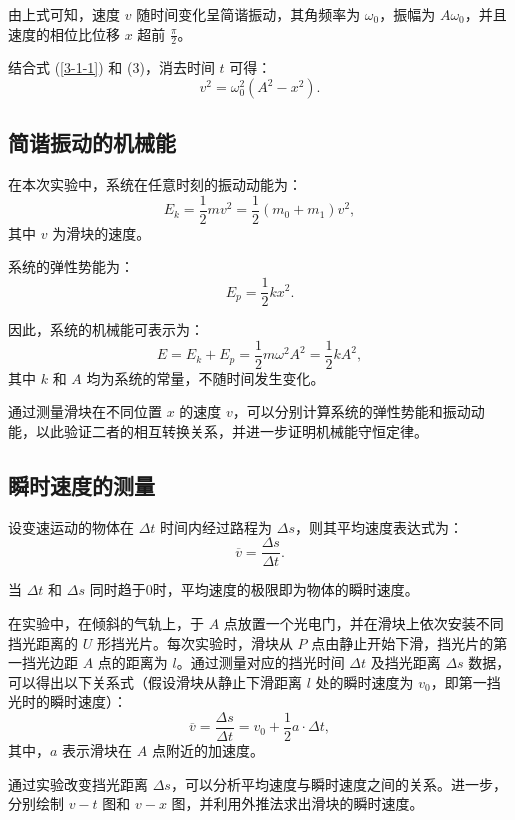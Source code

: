 \documentclass[UTF-8,twoside,cs4size]{ctexart}
\begin{document}
由上式可知，速度 $v$ 随时间变化呈简谐振动，其角频率为 $\omega_0$，振幅为 $A\omega_0$，并且速度的相位比位移 $x$ 超前 $\frac{\pi}{2}$。

结合式 (\ref{3-1-1}) 和 (3)，消去时间 $t$ 可得：
\[
v^2 = \omega_0^2 (A^2 - x^2).
\]

\subsection{简谐振动的机械能}
在本次实验中，系统在任意时刻的振动动能为：
\[
E_k = \frac{1}{2}m v^2 = \frac{1}{2}(m_0 + m_1)v^2,
\]
其中 $v$ 为滑块的速度。

系统的弹性势能为：
\[
E_p = \frac{1}{2}k x^2.
\]

因此，系统的机械能可表示为：
\begin{equation}\label{3-3-3}
    E = E_k + E_p = \frac{1}{2}m\omega^2 A^2 = \frac{1}{2}k A^2,
\end{equation}
其中 $k$ 和 $A$ 均为系统的常量，不随时间发生变化。

通过测量滑块在不同位置 $x$ 的速度 $v$，可以分别计算系统的弹性势能和振动动能，以此验证二者的相互转换关系，并进一步证明机械能守恒定律。

\subsection{瞬时速度的测量}

设变速运动的物体在 $\Delta t$ 时间内经过路程为 $\Delta s$，则其平均速度表达式为：
\[
\overline{v} = \frac{\Delta s}{\Delta t}.
\]

当 $\Delta t$ 和 $\Delta s$ 同时趋于0时，平均速度的极限即为物体的瞬时速度。

在实验中，在倾斜的气轨上，于 $A$ 点放置一个光电门，并在滑块上依次安装不同挡光距离的 $U$ 形挡光片。每次实验时，滑块从 $P$ 点由静止开始下滑，挡光片的第一挡光边距 $A$ 点的距离为 $l$。通过测量对应的挡光时间 $\Delta t$ 及挡光距离 $\Delta s$ 数据，可以得出以下关系式（假设滑块从静止下滑距离 $l$ 处的瞬时速度为 $v_0$，即第一挡光时的瞬时速度）：
\begin{equation}
    \overline{v} = \frac{\Delta s}{\Delta t} = v_0 + \frac{1}{2}a \cdot \Delta t,
\end{equation}
其中，$a$ 表示滑块在 $A$ 点附近的加速度。

通过实验改变挡光距离 $\Delta s$，可以分析平均速度与瞬时速度之间的关系。进一步，分别绘制 $v-t$ 图和 $v-x$ 图，并利用外推法求出滑块的瞬时速度。
\end{document}
